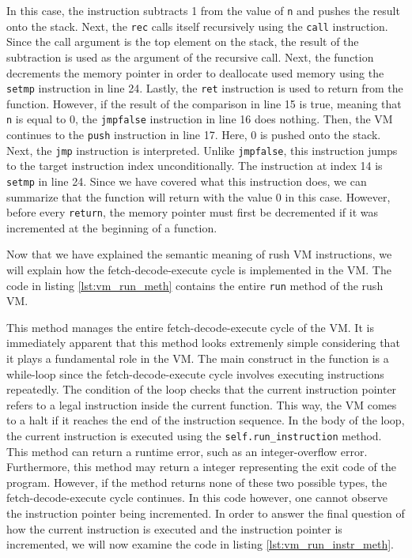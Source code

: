 In this case, the instruction subtracts 1 from the value of \texttt{n} and pushes the result onto the stack.
Next, the \texttt{rec} calls itself recursively using the \texttt{call} instruction.
Since the call argument is the top element on the stack, the result of the subtraction is used as the argument of the recursive call.
Next, the function decrements the memory pointer in order to deallocate used memory using the \texttt{setmp} instruction in line 24.
Lastly, the \texttt{ret} instruction is used to return from the function.
However, if the result of the comparison in line 15 is true, meaning that \texttt{n} is equal to 0, the \texttt{jmpfalse} instruction in line 16 does nothing.
Then, the VM continues to the \texttt{push} instruction in line 17.
Here, 0 is pushed onto the stack.
Next, the \texttt{jmp} instruction is interpreted.
Unlike \texttt{jmpfalse}, this instruction jumps to the target instruction index unconditionally.
The instruction at index 14 is \texttt{setmp} in line 24.
Since we have covered what this instruction does, we can summarize that the function will return with the value 0 in this case.
However, before every \texttt{return}, the memory pointer must first be decremented if it was incremented at the beginning of a function.

Now that we have explained the semantic meaning of rush VM instructions, we will explain how the fetch-decode-execute cycle is implemented in the VM.
The code in listing \ref{lst:vm_run_meth} contains the entire \texttt{run} method of the rush VM.


This method manages the entire fetch-decode-execute cycle of the VM.
It is immediately apparent that this method looks extremenly simple considering that it plays a fundamental role in the VM.
The main construct in the function is a while-loop since the fetch-decode-execute cycle involves executing instructions repeatedly.
The condition of the loop checks that the current instruction pointer refers to a legal instruction inside the current function.
This way, the VM comes to a halt if it reaches the end of the instruction sequence.
In the body of the loop, the current instruction is executed using the \texttt{self.run\_instruction} method.
This method can return a runtime error, such as an integer-overflow error.
Furthermore, this method may return a integer representing the exit code of the program.
However, if the method returns none of these two possible types, the fetch-decode-execute cycle continues.
In this code however, one cannot observe the instruction pointer being incremented.
In order to answer the final question of how the current instruction is executed and the instruction pointer is incremented, we will now examine the code in listing \ref{lst:vm_run_instr_meth}.

